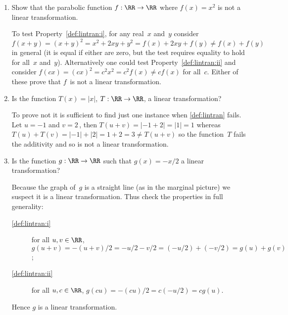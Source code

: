 \begin{example}[1D cases] \label{eg:}
\begin{enumerate}
\item Show that the parabolic function \(f:\RR\to\RR\) where \(f(x)=x^2\) is not a linear transformation.
\begin{solution} 
To test Property~\ref{def:lintran:i},  for any real~\(x\) and~\(y\) consider \(f(x+y)=(x+y)^2=x^2+2xy+y^2=f(x)+2xy+f(y)\neq f(x)+f(y)\) in general (it is equal if either are zero, but the test requires equality to hold for all~\(x\) and~\(y\)).  
Alternatively one could test Property~\ref{def:lintran:ii} and consider \(f(cx)=(cx)^2=c^2x^2=c^2f(x)\neq cf(x)\) for all~\(c\).
Either of these prove that \(f\)~is not a linear transformation.
\end{solution}

\item Is the function \(T(x)=|x|\), \(T:\RR\to\RR\), a linear transformation? 
\begin{solution} 
To prove not it is sufficient to find just one instance when \autoref{def:lintran} fails. 
Let \(u=-1\) and \(v=2\)\,, then \(T(u+v)=|-1+2|=|1|=1\) whereas \(T(u)+T(v)=|-1|+|2|=1+2=3\neq T(u+v)\) so the function~\(T\) fails the additivity and so is not a linear transformation.
\end{solution}

\item Is the function \(g:\RR\to\RR\) such that \(g(x)=-x/2\) a linear transformation?
\begin{solution} 
Because the graph of~\(g\) is a straight line (as in the marginal picture) we suspect it is a linear transformation.
Thus check the properties in full generality:
\begin{description}
\item[\ref{def:lintran:i}] for all \(u,v\in\RR\), \(g(u+v)=-(u+v)/2=-u/2-v/2=(-u/2)+(-v/2)=g(u)+g(v)\);
\item[\ref{def:lintran:ii}] for all \(u,c\in\RR\), \(g(cu)=-(cu)/2=c(-u/2)=cg(u)\).
\end{description}
Hence \(g\) is a linear transformation.
\end{solution}


\end{enumerate}
\end{example}

